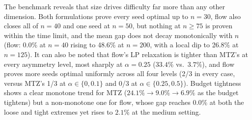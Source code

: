 \documentclass[11pt,a4paper]{article}
\begin{document}
The benchmark reveals that size drives difficulty far more than any other dimension. Both formulations prove every seed optimal up to $n = 30$, flow also closes all of $n = 40$ and one seed at $n = 50$, but nothing at $n \geq 75$ is proven within the time limit, and the mean gap does not decay monotonically with $n$ (flow: 0.0\% at $n=40$ rising to 48.6\% at $n=200$, with a local dip to 26.8\% at $n=125$).
It can also be noted that flow's LP relaxation is tighter than MTZ's at every asymmetry level, most sharply at $\alpha = 0.25$ ($33.4\%$ vs.\ $3.7\%$), and flow proves more seeds optimal uniformly across all four levels (2/3 in every case, versus MTZ's 1/3 at $\alpha \in \{0, 0.1\}$ and 0/3 at $\alpha \in \{0.25, 0.5\}$).
Budget tightness shows a clear monotone trend for MTZ ($24.1\% \to 9.0\% \to 6.9\%$ as the budget tightens) but a non-monotone one for flow, whose gap reaches $0.0\%$ at both the loose and tight extremes yet rises to $2.1\%$ at the medium setting.

\begin{table}[H]
\centering
\caption{Benchmark results: extreme/boundary-case instances, $\lambda = 4.1\times10^{-5}$, $\rho = 0$ throughout}
\label{tab:bench_extreme}
\end{table}
\end{document}
